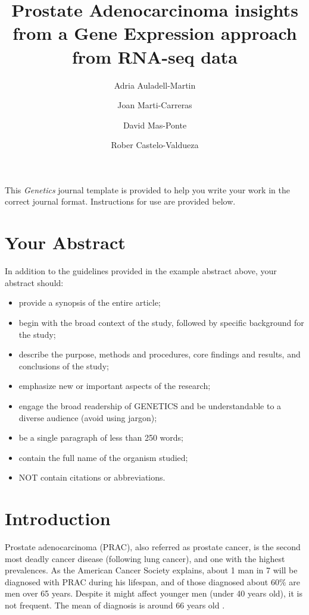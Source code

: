 \documentclass[9pt,twocolumn,twoside]{gsajnl}
\title{Prostate Adenocarcinoma insights from a Gene Expression approach from RNA-seq data}
\author[$\ast$,$\dagger$]{Adria Auladell-Martin}
\author[$\ast$,$\dagger$]{Joan Marti-Carreras}
\author[$\ast$,$\dagger$]{David Mas-Ponte}
\author[$\ast$,1]{Rober Castelo-Valdueza}
\affil[$\ast$]{M.Sc. in Bioinformatics at Department of Experimental and Health Sciences (CEXS), Universitat Pompeu Fabra}
\affil[$\dagger$]{Authors Contributed Equally to this work}
\begin{document}
\maketitle
\thispagestyle{firststyle}
\marginmark
\firstpagefootnote
{}
\vspace{-11pt}%

\lettrine[lines=2]{\color{color2}T}{}his \textit{Genetics} journal template is provided to help you write your work in the correct journal format. Instructions for use are provided below. 

\section*{Your Abstract}

In addition to the guidelines provided in the example abstract above, your abstract should:

\begin{itemize}
\item provide a synopsis of the entire article;
\item begin with the broad context of the study, followed by specific background for the study;
\item describe the purpose, methods and procedures, core findings and results, and conclusions of the study;
\item emphasize new or important aspects of the research;
\item engage the broad readership of GENETICS and be understandable to a diverse audience (avoid using jargon);
\item be a single paragraph of less than 250 words;
\item contain the full name of the organism studied;
\item NOT contain citations or abbreviations.
\end{itemize}


\section*{Introduction}
Prostate adenocarcinoma (PRAC), also referred as prostate cancer, is  the second most deadly cancer disease (following lung cancer), and one with the highest prevalences. As the American Cancer Society explains, about 1 man in 7 will be diagnosed with PRAC during his lifespan, and of those diagnosed about 60\% are men over 65 years. Despite it might affect younger men (under 40 years old), it is not frequent. The mean of diagnosis is around 66 years old \citep{prostatestatistics}.
\end{document}
